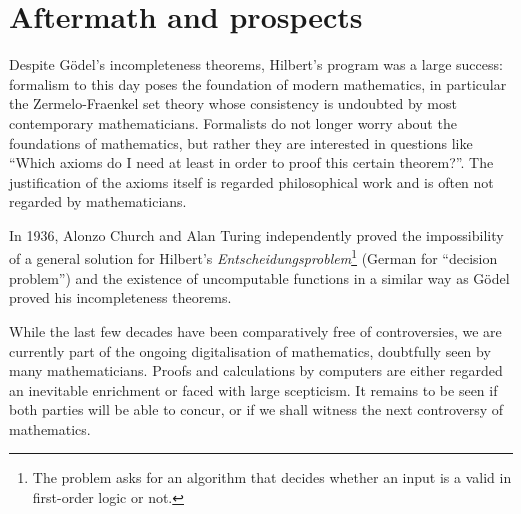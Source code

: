 \documentclass[hidelinks]{article}
\begin{document}
\section{Aftermath and prospects}
Despite Gödel's incompleteness theorems, Hilbert's program was a large success: formalism to this day poses the foundation of modern mathematics, in particular the Zermelo-Fraenkel set theory whose consistency is undoubted by most contemporary mathematicians.  
Formalists do not longer worry about the foundations of mathematics, but rather they are interested in questions like ``Which axioms do I need at least in order to proof this certain theorem?''. The justification of the axioms itself is regarded philosophical work and is often not regarded by mathematicians.

In 1936, Alonzo Church and Alan Turing independently proved the impossibility of a general solution for Hilbert's \textit{Entscheidungsproblem}\footnote{The problem asks for an algorithm that decides whether an input is a valid in first-order logic or not.} (German for ``decision problem'') and the existence of uncomputable functions in a similar way as Gödel proved his incompleteness theorems.

While the last few decades have been comparatively free of controversies, we are currently part of the ongoing digitalisation of mathematics, doubtfully seen by many mathematicians. Proofs and calculations by computers are either regarded an inevitable enrichment or faced with large scepticism. It remains to be seen if both parties will be able to concur, or if we shall witness the next controversy of mathematics.

\newpage


\end{document}
